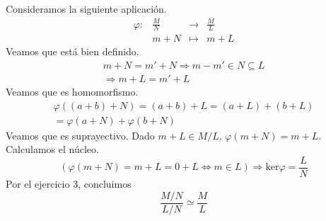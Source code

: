 \documentclass{article}
\begin{document}
\begin{multicols}{2}
\section{}
\noindent Consideramos la siguiente aplicación.
$$
\begin{array}{crcl}
\varphi : & \frac{M}{N} & \longrightarrow & \frac{M}{L} \\
& m+N & \longmapsto     & m+L
\end{array}
$$
Veamos que está bien definido.
$$
\begin{array}{c}
    m+N = m'+N \Rightarrow m-m'\in N \subseteq L \\
    \Rightarrow m+L = m'+L
\end{array}
$$
Veamos que es homomorfismo.\\
$$
\begin{array}{c}
    \varphi((a+b)+N) = (a+b)+L = (a+L)+(b+L) \\
    = \varphi(a+N) + \varphi(b+N)
\end{array}
$$
Veamos que es suprayectivo. Dado $m+L \in M/L$, $\varphi(m+N) = m+L$.\\
Calculamos el núcleo.
$$
\left(\varphi(m+N)=m+L=0+L \Leftrightarrow m\in L\right) \Rightarrow \text{ker}\varphi = \frac{L}{N}
$$
Por el ejercicio 3, concluimos
$$
\frac{M/N}{L/N} \simeq \frac{M}{L}
$$

\end{multicols}
\end{document}
